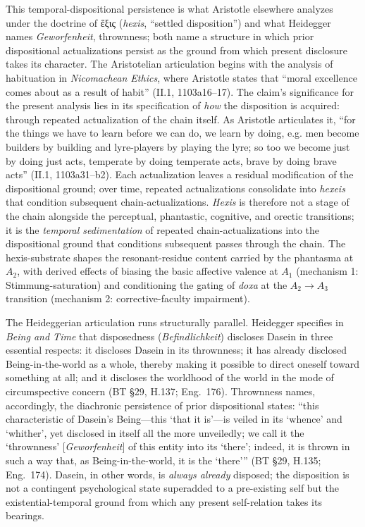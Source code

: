 \documentclass{article}
\begin{document}
This temporal-dispositional persistence is what Aristotle elsewhere analyzes under the doctrine of ἕξις (\textit{hexis}, ``settled disposition'') and what Heidegger names \textit{Geworfenheit}, thrownness; both name a structure in which prior dispositional actualizations persist as the ground from which present disclosure takes its character. The Aristotelian articulation begins with the analysis of habituation in \textit{Nicomachean Ethics}, where Aristotle states that ``moral excellence comes about as a result of habit'' (II.1, 1103a16--17). The claim's significance for the present analysis lies in its specification of \textit{how} the disposition is acquired: through repeated actualization of the chain itself. As Aristotle articulates it, ``for the things we have to learn before we can do, we learn by doing, e.g. men become builders by building and lyre-players by playing the lyre; so too we become just by doing just acts, temperate by doing temperate acts, brave by doing brave acts'' (II.1, 1103a31--b2). Each actualization leaves a residual modification of the dispositional ground; over time, repeated actualizations consolidate into \textit{hexeis} that condition subsequent chain-actualizations. \textit{Hexis} is therefore not a stage of the chain alongside the perceptual, phantastic, cognitive, and orectic transitions; it is the \textit{temporal sedimentation} of repeated chain-actualizations into the dispositional ground that conditions subsequent passes through the chain. The hexis-substrate shapes the resonant-residue content carried by the phantasma at $A_2$, with derived effects of biasing the basic affective valence at $A_1$ (mechanism 1: Stimmung-saturation) and conditioning the gating of \textit{doxa} at the $A_2 \rightarrow A_3$ transition (mechanism 2: corrective-faculty impairment).

The Heideggerian articulation runs structurally parallel. Heidegger specifies in \textit{Being and Time} that disposedness (\textit{Befindlichkeit}) discloses Dasein in three essential respects: it discloses Dasein in its thrownness; it has already disclosed Being-in-the-world as a whole, thereby making it possible to direct oneself toward something at all; and it discloses the worldhood of the world in the mode of circumspective concern (BT \S29, H.137; Eng.~176). Thrownness names, accordingly, the diachronic persistence of prior dispositional states: ``this characteristic of Dasein's Being---this `that it is'---is veiled in its `whence' and `whither', yet disclosed in itself all the more unveiledly; we call it the `thrownness' [\textit{Geworfenheit}] of this entity into its `there'; indeed, it is thrown in such a way that, as Being-in-the-world, it is the `there''' (BT \S29, H.135; Eng.~174). Dasein, in other words, is \textit{always already} disposed; the disposition is not a contingent psychological state superadded to a pre-existing self but the existential-temporal ground from which any present self-relation takes its bearings.
\end{document}
